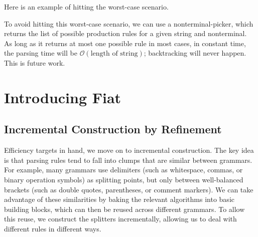   Here is an example of hitting the worst-case scenario.  %

  To avoid hitting this worst-case scenario, we can use a nonterminal-picker, which returns the list of possible production rules for a given string and nonterminal.  As long as it returns at most one possible rule in most cases, in constant time, the parsing time will be $\mathcal O(\text{length of string})$; backtracking will never happen.  This is future work.
  
\section{Introducing Fiat}
  \subsection{Incremental Construction by Refinement}
  Efficiency targets in hand, we move on to incremental construction.  The key idea is that parsing rules tend to fall into clumps that are similar between grammars.  For example, many grammars use delimiters (such as whitespace, commas, or binary operation symbols) as splitting points, but only between well-balanced brackets (such as double quotes, parentheses, or comment markers).  We can take advantage of these similarities by baking the relevant algorithms into basic building blocks, which can then be reused across different grammars.  To allow this reuse, we construct the splitters incrementally, allowing us to deal with different rules in different ways.
  
